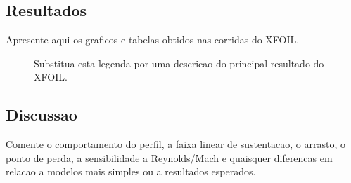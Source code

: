 \subsection{Resultados}

Apresente aqui os graficos e tabelas obtidos nas corridas do XFOIL.

\begin{figure}[H]
\centering
\caption{Substitua esta legenda por uma descricao do principal resultado
do XFOIL.}
\label{fig:xfoil-polar}
\end{figure}

\subsection{Discussao}

Comente o comportamento do perfil, a faixa linear de sustentacao,
o arrasto, o ponto de perda, a sensibilidade a Reynolds/Mach e quaisquer
diferencas em relacao a modelos mais simples ou a resultados esperados.
